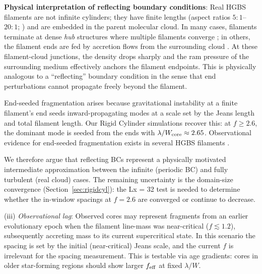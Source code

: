 \documentclass[twoside,twocolumn]{mnras}
\begin{document}
\textbf{Physical interpretation of reflecting boundary conditions}: Real HGBS filaments
are not infinite cylinders; they have finite lengths (aspect ratios $5:1$--$20:1$;
\citealt{Arzoumanian2019}) and are embedded in the parent molecular cloud. In many cases,
filaments terminate at dense \textit{hub} structures where multiple filaments converge
\citep{Andre2010}; in others, the filament ends are fed by accretion flows from the
surrounding cloud \citep{Inutsuka1997, Pineda2023}. At these filament-cloud junctions,
the density drops sharply and the ram pressure of the surrounding medium effectively
anchors the filament endpoints. This is physically analogous to a ``reflecting'' boundary
condition in the sense that end perturbations cannot propagate freely beyond the
filament.

End-seeded fragmentation arises because gravitational instability at a finite filament's end seeds inward-propagating modes at a scale set by the Jeans length and total filament length. Our Rigid Cylinder simulations recover this: at $f \geq 2.6$, the dominant mode is seeded from the ends with $\lambda/W_{\rm core} \approx 2.65$. Observational evidence for end-seeded fragmentation exists in several HGBS filaments \citep{Pineda2023, Andre2010}.

We therefore argue that reflecting BCs represent a physically motivated intermediate
approximation between the infinite (periodic BC) and fully turbulent (real cloud) cases.
The remaining uncertainty is the domain-size convergence (Section~\ref{sec:rigidcyl}):
the Lx = 32 test is needed to determine whether the in-window spacings at $f = 2.6$
are converged or continue to decrease.

(iii) \textit{Observational lag}: Observed cores may represent fragments from an earlier evolutionary epoch when the filament line-mass was near-critical ($f \lesssim 1.2$), subsequently accreting mass to its current supercritical state. In this scenario the spacing is set by the initial (near-critical) Jeans scale, and the current $f$ is irrelevant for the spacing measurement. This is testable via age gradients: cores in older star-forming regions should show larger $f_{\rm eff}$ at fixed $\lambda/W$.
\end{document}
